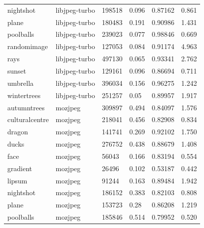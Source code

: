 \documentclass[12pt]{article}
\begin{document}
{\begin{longtable}{llllll}
	nightshot      & libjpeg-turbo    & 198518       & 0.096              & 0.87162   & 0.861                \\
	plane          & libjpeg-turbo    & 180483       & 0.191              & 0.90986   & 1.431                \\
	poolballs      & libjpeg-turbo    & 239023       & 0.077              & 0.98846   & 0.669                \\
	randomimage    & libjpeg-turbo    & 127053       & 0.084              & 0.91174   & 4.963                \\
	rays           & libjpeg-turbo    & 497130       & 0.065              & 0.93341   & 2.762                \\
	sunset         & libjpeg-turbo    & 129161       & 0.096              & 0.86694   & 0.711                \\
	umbrella       & libjpeg-turbo    & 396034       & 0.156              & 0.96275   & 1.242                \\
	wintertrees    & libjpeg-turbo    & 251257       & 0.05               & 0.89957   & 1.917                \\
	autumntrees    & mozjpeg          & 309897       & 0.494              & 0.84097   & 1.576                \\
	culturalcentre & mozjpeg          & 218041       & 0.456              & 0.82908   & 0.834                \\
	dragon         & mozjpeg          & 141741       & 0.269              & 0.92102   & 1.750                \\
	ducks          & mozjpeg          & 276752       & 0.438              & 0.88679   & 1.408                \\
	face           & mozjpeg          & 56043        & 0.166              & 0.83194   & 0.554                \\
	gradient       & mozjpeg          & 26496        & 0.102              & 0.53187   & 0.442                \\
	lipsum         & mozjpeg          & 91244        & 0.163              & 0.89484   & 1.942                \\
	nightshot      & mozjpeg          & 186152       & 0.383              & 0.82103   & 0.808                \\
	plane          & mozjpeg          & 153723       & 0.28               & 0.86208   & 1.219                \\
	poolballs      & mozjpeg          & 185846       & 0.514              & 0.79952   & 0.520                \\

\end{longtable}}
\end{document}
